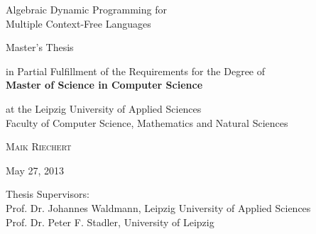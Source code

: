 \begin{titlepage}
$ $
\vspace{1cm}
\center
\sffamily

\LARGE{Algebraic Dynamic Programming for\\Multiple Context-Free Languages}

\vspace{2.5em}
\Large{
    Master's Thesis
}

\vspace{2.5em}

\large{
        in Partial Fulfillment of the Requirements for the Degree of\\
        \textbf{Master of Science in Computer Science}
}

\vspace{2em}

\large{
	at the Leipzig University of Applied Sciences \\
	Faculty of Computer Science, Mathematics and Natural Sciences
}

\vspace{2.5em}

\Large{\textrm{\textsc{Maik Riechert}}}

\vspace{2.5em}

\normalsize{May 27, 2013}

\vspace{4em}

\normalsize{
    Thesis Supervisors:  \\
    Prof. Dr. Johannes Waldmann, Leipzig University of Applied Sciences\\
    Prof. Dr. Peter F. Stadler, University of Leipzig
}

\end{titlepage}
